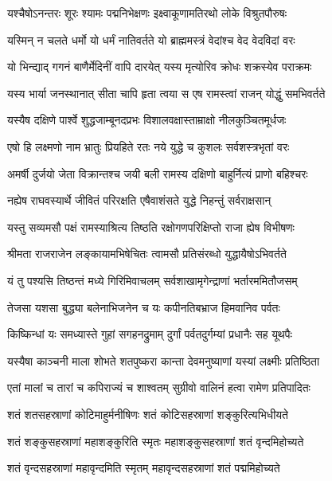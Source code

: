 \twolineshloka
{यश्चैषोऽनन्तरः शूरः श्यामः पद्मनिभेक्षणः}
{इक्ष्वाकूणामतिरथो लोके विश्रुतपौरुषः} %

\twolineshloka
{यस्मिन् न चलते धर्मो यो धर्मं नातिवर्तते}
{यो ब्राह्ममस्त्रं वेदांश्च वेद वेदविदां वरः} %

\twolineshloka
{यो भिन्द्याद् गगनं बाणैर्मेदिनीं वापि दारयेत्}
{यस्य मृत्योरिव क्रोधः शक्रस्येव पराक्रमः} %

\twolineshloka
{यस्य भार्या जनस्थानात् सीता चापि हृता त्वया}
{स एष रामस्त्वां राजन् योद्धुं समभिवर्तते} %

\twolineshloka
{यस्यैष दक्षिणे पार्श्वे शुद्धजाम्बूनदप्रभः}
{विशालवक्षास्ताम्राक्षो नीलकुञ्चितमूर्धजः} %

\twolineshloka
{एषो हि लक्ष्मणो नाम भ्रातुः प्रियहिते रतः}
{नये युद्धे च कुशलः सर्वशस्त्रभृतां वरः} %

\twolineshloka
{अमर्षी दुर्जयो जेता विक्रान्तश्च जयी बली}
{रामस्य दक्षिणो बाहुर्नित्यं प्राणो बहिश्चरः} %

\twolineshloka
{नह्येष राघवस्यार्थे जीवितं परिरक्षति}
{एषैवाशंसते युद्धे निहन्तुं सर्वराक्षसान्} %

\twolineshloka
{यस्तु सव्यमसौ पक्षं रामस्याश्रित्य तिष्ठति}
{रक्षोगणपरिक्षिप्तो राजा ह्येष विभीषणः} %

\twolineshloka
{श्रीमता राजराजेन लङ्कायामभिषेचितः}
{त्वामसौ प्रतिसंरब्धो युद्धायैषोऽभिवर्तते} %

\twolineshloka
{यं तु पश्यसि तिष्ठन्तं मध्ये गिरिमिवाचलम्}
{सर्वशाखामृगेन्द्राणां भर्तारममितौजसम्} %

\twolineshloka
{तेजसा यशसा बुद्ध्या बलेनाभिजनेन च}
{यः कपीनतिबभ्राज हिमवानिव पर्वतः} %

\twolineshloka
{किष्किन्धां यः समध्यास्ते गुहां सगहनद्रुमाम्}
{दुर्गां पर्वतदुर्गम्यां प्रधानैः सह यूथपैः} %

\twolineshloka
{यस्यैषा काञ्चनी माला शोभते शतपुष्करा}
{कान्ता देवमनुष्याणां यस्यां लक्ष्मीः प्रतिष्ठिता} %

\twolineshloka
{एतां मालां च तारां च कपिराज्यं च शाश्वतम्}
{सुग्रीवो वालिनं हत्वा रामेण प्रतिपादितः} %

\twolineshloka
{शतं शतसहस्राणां कोटिमाहुर्मनीषिणः}
{शतं कोटिसहस्राणां शङ्कुरित्यभिधीयते} %

\twolineshloka
{शतं शङ्कुसहस्राणां महाशङ्कुरिति स्मृतः}
{महाशङ्कुसहस्राणां शतं वृन्दमिहोच्यते} %

\twolineshloka
{शतं वृन्दसहस्राणां महावृन्दमिति स्मृतम्}
{महावृन्दसहस्राणां शतं पद्ममिहोच्यते} %

